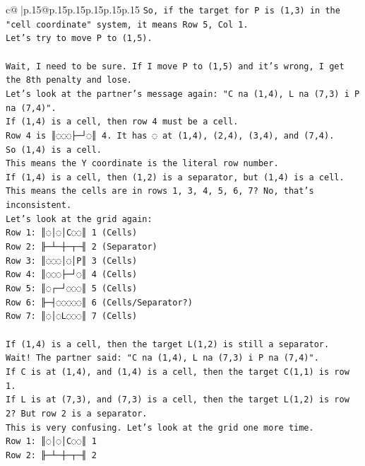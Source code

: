 \documentclass{article}
\begin{document}
{\begin{supertabular}{c@{$\;$}|p{.15\linewidth}@{}p{.15\linewidth}p{.15\linewidth}p{.15\linewidth}p{.15\linewidth}p{.15\linewidth}}
{{{\texttt{So, if the target for P is (1,3) in the "cell coordinate" system, it means Row 5, Col 1.} \\
\texttt{Let's try to move P to (1,5).} \\
\\ 
\texttt{Wait, I need to be sure. If I move P to (1,5) and it's wrong, I get the 8th penalty and lose.} \\
\texttt{Let's look at the partner's message again: "C na (1,4), L na (7,3) i P na (7,4)".} \\
\texttt{If (1,4) is a cell, then row 4 must be a cell.} \\
\texttt{Row 4 is ║◌◌◌├─┘◌║ 4. It has ◌ at (1,4), (2,4), (3,4), and (7,4).} \\
\texttt{So (1,4) is a cell.} \\
\texttt{This means the Y coordinate is the literal row number.} \\
\texttt{If (1,4) is a cell, then (1,2) is a separator, but (1,4) is a cell.} \\
\texttt{This means the cells are in rows 1, 3, 4, 5, 6, 7? No, that's inconsistent.} \\
\texttt{Let's look at the grid again:} \\
\texttt{Row 1: ║◌│◌│C◌◌║ 1 (Cells)} \\
\texttt{Row 2: ╟─┴─┼─┬─╢ 2 (Separator)} \\
\texttt{Row 3: ║◌◌◌│◌│P║ 3 (Cells)} \\
\texttt{Row 4: ║◌◌◌├─┘◌║ 4 (Cells)} \\
\texttt{Row 5: ║◌┌─┘◌◌◌║ 5 (Cells)} \\
\texttt{Row 6: ╟─┤◌◌◌◌◌║ 6 (Cells/Separator?)} \\
\texttt{Row 7: ║◌│◌L◌◌◌║ 7 (Cells)} \\
\\ 
\texttt{If (1,4) is a cell, then the target L(1,2) is still a separator.} \\
\texttt{Wait! The partner said: "C na (1,4), L na (7,3) i P na (7,4)".} \\
\texttt{If C is at (1,4), and (1,4) is a cell, then the target C(1,1) is row 1.} \\
\texttt{If L is at (7,3), and (7,3) is a cell, then the target L(1,2) is row 2? But row 2 is a separator.} \\
\texttt{This is very confusing. Let's look at the grid one more time.} \\
\texttt{Row 1: ║◌│◌│C◌◌║ 1} \\
\texttt{Row 2: ╟─┴─┼─┬─╢ 2} \\
}}}
\end{supertabular}}
\end{document}
